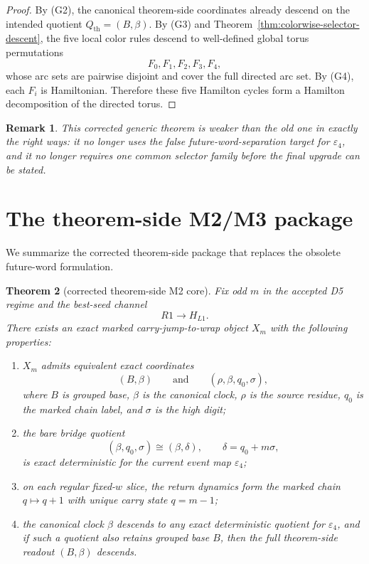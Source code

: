 \documentclass[11pt]{article}
\newtheorem{theorem}{Theorem}[section]
\newtheorem{remark}[theorem]{Remark}
\newcommand{\eps}{\varepsilon}
\begin{document}
\begin{proof}
By (G2), the canonical theorem-side coordinates already descend on the intended
quotient $Q_{\mathrm{th}}=(B,\beta)$.
By (G3) and Theorem~\ref{thm:colorwise-selector-descent}, the five local color
rules descend to well-defined global torus permutations
\[
F_0,F_1,F_2,F_3,F_4,
\]
whose arc sets are pairwise disjoint and cover the full directed arc set.
By (G4), each $F_i$ is Hamiltonian.
Therefore these five Hamilton cycles form a Hamilton decomposition of the
directed torus.
\end{proof}

\begin{remark}
This corrected generic theorem is weaker than the old one in exactly the right
ways: it no longer uses the false future-word-separation target for $\eps_4$,
and it no longer requires one common selector family before the final upgrade
can be stated.
\end{remark}

\section{The theorem-side M2/M3 package}

We summarize the corrected theorem-side package that replaces the obsolete
future-word formulation.

\begin{theorem}[corrected theorem-side M2 core]
\label{thm:corrected-M2-core}
Fix odd $m$ in the accepted D5 regime and the best-seed channel
\[
R1\to H_{L1}.
\]
There exists an exact marked carry-jump-to-wrap object $X_m$ with the following
properties:
\begin{enumerate}[label=\textup{(M2\arabic*)},leftmargin=2.9em]
\item $X_m$ admits equivalent exact coordinates
      \[
      (B,\beta)
      \qquad\text{and}\qquad
      (\rho,\beta,q_0,\sigma),
      \]
      where $B$ is grouped base, $\beta$ is the canonical clock, $\rho$ is the
      source residue, $q_0$ is the marked chain label, and $\sigma$ is the high
      digit;
\item the bare bridge quotient
      \[
      (\beta,q_0,\sigma)\cong(\beta,\delta),
      \qquad
      \delta=q_0+m\sigma,
      \]
      is exact deterministic for the current event map $\eps_4$;
\item on each regular fixed-$w$ slice, the return dynamics form the marked
      chain $q\mapsto q+1$ with unique carry state $q=m-1$;
\item the canonical clock $\beta$ descends to any exact deterministic quotient
      for $\eps_4$, and if such a quotient also retains grouped base $B$, then
      the full theorem-side readout $(B,\beta)$ descends.
\end{enumerate}
\end{theorem}
\end{document}
